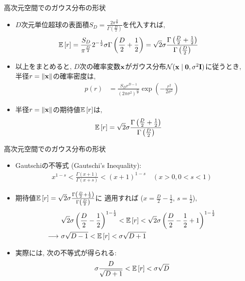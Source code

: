\documentclass[dvipdfmx,notheorems,t]{beamer}
\begin{document}
\begin{frame}{高次元空間でのガウス分布の形状}
\begin{itemize}
  \item $D$次元単位超球の表面積$S_D = \frac{2 \pi^\frac{D}{2}}{\Gamma \left( \frac{D}{2} \right)}$を代入すれば,
  \begin{align*}
    \operatorname{\mathbb{E}} \left[ r \right] &= \frac{S_D}{\pi^\frac{D}{2}} 2^{-\frac{1}{2}} \sigma \Gamma \left( \frac{D}{2} + \frac{1}{2} \right)
      = \sqrt{2} \sigma \frac{\Gamma \left( \frac{D}{2} + \frac{1}{2} \right)}{\Gamma \left( \frac{D}{2} \right)}
  \end{align*}

  \item 以上をまとめると, $D$次の確率変数$\vb{x}$がガウス分布$\mathcal{N}(\vb{x} \mid \vb{0}, \sigma^2 \vb{I})$に従うとき,
  半径$r = \left\| \vb{x} \right\|$の確率密度は,
  \begin{align*}
    p(r) &= \frac{S_D r^{D - 1}}{(2\pi \sigma^2)^\frac{D}{2}} \exp(-\frac{r^2}{2 \sigma^2})
  \end{align*}

  \item 半径$r = \left\| \vb{x} \right\|$の期待値$\operatorname{\mathbb{E}} \left[ r \right]$は,
  \begin{align*}
    \operatorname{\mathbb{E}} \left[ r \right] &= \sqrt{2} \sigma \frac{\Gamma \left( \frac{D}{2} + \frac{1}{2} \right)}{\Gamma \left( \frac{D}{2} \right)}
  \end{align*}
\end{itemize}
\end{frame}

\begin{frame}{高次元空間でのガウス分布の形状}
\begin{itemize}
  \item Gautschiの不等式 (Gautschi's Inequality):
  \begin{align*}
    x^{1 - s} < \frac{\Gamma(x + 1)}{\Gamma(x + s)} < (x + 1)^{1 - s} \quad (x > 0, 0 < s < 1)
  \end{align*}

  \item 期待値$\operatorname{\mathbb{E}} \left[ r \right] = \sqrt{2} \sigma \frac{\Gamma \left( \frac{D}{2} + \frac{1}{2} \right)}{\Gamma \left( \frac{D}{2} \right)}$に
  適用すれば ($x = \frac{D}{2} - \frac{1}{2}$, $s = \frac{1}{2}$),
  \begin{align*}
    & \sqrt{2} \sigma \left( \frac{D}{2} - \frac{1}{2} \right)^{1 - \frac{1}{2}}
      < \operatorname{\mathbb{E}} \left[ r \right] < \sqrt{2} \sigma \left( \frac{D}{2} - \frac{1}{2} + 1 \right)^{1 - \frac{1}{2}} \\
    \longrightarrow \ & \sigma \sqrt{D - 1} < \operatorname{\mathbb{E}} \left[ r \right] < \sigma \sqrt{D + 1}
  \end{align*}

  \item 実際には, 次の不等式が得られる:
  \begin{align*}
    \sigma \frac{D}{\sqrt{D + 1}} < \operatorname{\mathbb{E}} \left[ r \right] < \sigma \sqrt{D}
  \end{align*}
\end{itemize}
\end{frame}
\end{document}
